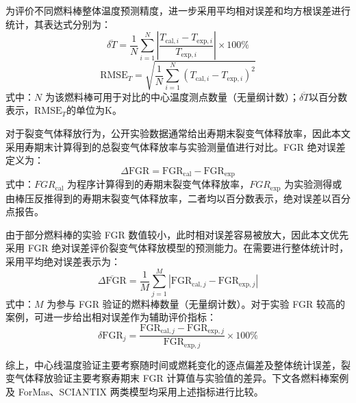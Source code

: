 为评价不同燃料棒整体温度预测精度，进一步采用平均相对误差和均方根误差进行统计，其表达式分别为：
\begin{equation}
	\overline{\delta T} =
	\frac{1}{N}\sum_{i=1}^{N}
	\left|
	\frac{T_{\mathrm{cal},i}-T_{\mathrm{exp},i}}{T_{\mathrm{exp},i}}
	\right|\times 100\%
\end{equation}
\begin{equation}
	\mathrm{RMSE}_T =
	\sqrt{
		\frac{1}{N}\sum_{i=1}^{N}
		\left(T_{\mathrm{cal},i}-T_{\mathrm{exp},i}\right)^2
	}
\end{equation}
\noindent 式中：$N$ 为该燃料棒可用于对比的中心温度测点数量（无量纲计数）；$\overline{\delta T}$以百分数表示，$\mathrm{RMSE}_T$的单位为$\mathrm{K}$。

对于裂变气体释放行为，公开实验数据通常给出寿期末裂变气体释放率，因此本文采用寿期末计算得到的总裂变气体释放率与实验测量值进行对比。FGR 绝对误差定义为：
\begin{equation}
	\Delta \mathrm{FGR} = \mathrm{FGR}_{\mathrm{cal}} - \mathrm{FGR}_{\mathrm{exp}}
\end{equation}
\noindent 式中：$FGR_{\mathrm{cal}}$ 为程序计算得到的寿期末裂变气体释放率，$FGR_{\mathrm{exp}}$ 为实验测得或由棒压反推得到的寿期末裂变气体释放率，二者均以百分数表示，绝对误差以百分点报告。

由于部分燃料棒的实验 FGR 数值较小，此时相对误差容易被放大，因此本文优先采用 FGR 绝对误差评价裂变气体释放模型的预测能力。在需要进行整体统计时，采用平均绝对误差表示为：
\begin{equation}
	\overline{\Delta \mathrm{FGR}} =
	\frac{1}{M}\sum_{j=1}^{M}
	\left|\mathrm{FGR}_{\mathrm{cal},j}-\mathrm{FGR}_{\mathrm{exp},j}\right|
\end{equation}
\noindent 式中：$M$ 为参与 FGR 验证的燃料棒数量（无量纲计数）。对于实验 FGR 较高的案例，可进一步给出相对误差作为辅助评价指标：
\begin{equation}
	\delta \mathrm{FGR}_j =
	\frac{\mathrm{FGR}_{\mathrm{cal},j}-\mathrm{FGR}_{\mathrm{exp},j}}
	{\mathrm{FGR}_{\mathrm{exp},j}}\times 100\%
\end{equation}

综上，中心线温度验证主要考察随时间或燃耗变化的逐点偏差及整体统计误差，裂变气体释放验证主要考察寿期末 FGR 计算值与实验值的差异。下文各燃料棒案例及 ForMas、SCIANTIX 两类模型均采用上述指标进行比较。




